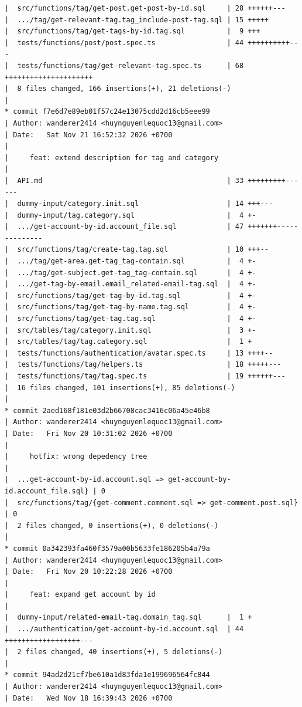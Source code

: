 \documentclass[12pt]{article}
\begin{document}
\begin{lstlisting}[numbers=none,breaklines=true]
|  src/functions/tag/get-post.get-post-by-id.sql     | 28 ++++++---
|  .../tag/get-relevant-tag.tag_include-post-tag.sql | 15 +++++
|  src/functions/tag/get-tags-by-id.tag.sql          |  9 +++
|  tests/functions/post/post.spec.ts                 | 44 ++++++++++---
|  tests/functions/tag/get-relevant-tag.spec.ts      | 68 +++++++++++++++++++++
|  8 files changed, 166 insertions(+), 21 deletions(-)
|
* commit f7e6d7e89eb01f57c24e13075cdd2d16cb5eee99
| Author: wanderer2414 <huynguyenlequoc13@gmail.com>
| Date:   Sat Nov 21 16:52:32 2026 +0700
|
|     feat: extend description for tag and category
|
|  API.md                                            | 33 +++++++++------
|  dummy-input/category.init.sql                     | 14 +++---
|  dummy-input/tag.category.sql                      |  4 +-
|  .../get-account-by-id.account_file.sql            | 47 +++++++--------------
|  src/functions/tag/create-tag.tag.sql              | 10 +++--
|  .../tag/get-area.get-tag_tag-contain.sql          |  4 +-
|  .../tag/get-subject.get-tag_tag-contain.sql       |  4 +-
|  .../get-tag-by-email.email_related-email-tag.sql  |  4 +-
|  src/functions/tag/get-tag-by-id.tag.sql           |  4 +-
|  src/functions/tag/get-tag-by-name.tag.sql         |  4 +-
|  src/functions/tag/get-tag.tag.sql                 |  4 +-
|  src/tables/tag/category.init.sql                  |  3 +-
|  src/tables/tag/tag.category.sql                   |  1 +
|  tests/functions/authentication/avatar.spec.ts     | 13 ++++--
|  tests/functions/tag/helpers.ts                    | 18 +++++---
|  tests/functions/tag/tag.spec.ts                   | 19 ++++++---
|  16 files changed, 101 insertions(+), 85 deletions(-)
|
* commit 2aed168f181e03d2b66708cac3416c06a45e46b8
| Author: wanderer2414 <huynguyenlequoc13@gmail.com>
| Date:   Fri Nov 20 10:31:02 2026 +0700
|
|     hotfix: wrong depedency tree
|
|  ...get-account-by-id.account.sql => get-account-by-id.account_file.sql} | 0
|  src/functions/tag/{get-comment.comment.sql => get-comment.post.sql}     | 0
|  2 files changed, 0 insertions(+), 0 deletions(-)
|
* commit 0a342393fa460f3579a00b5633fe186205b4a79a
| Author: wanderer2414 <huynguyenlequoc13@gmail.com>
| Date:   Fri Nov 20 10:22:28 2026 +0700
|
|     feat: expand get account by id
|
|  dummy-input/related-email-tag.domain_tag.sql      |  1 +
|  .../authentication/get-account-by-id.account.sql  | 44 ++++++++++++++++++---
|  2 files changed, 40 insertions(+), 5 deletions(-)
|
* commit 94ad2d21cf7be610a1d83fda1e199696564fc844
| Author: wanderer2414 <huynguyenlequoc13@gmail.com>
| Date:   Wed Nov 18 16:39:43 2026 +0700

\end{lstlisting}
\end{document}
